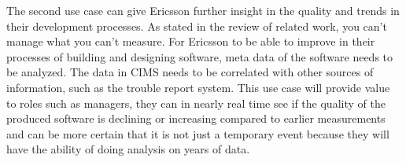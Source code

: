 The second use case can give Ericsson further insight in the quality and trends in their development processes. As stated in the review of related work, you can't manage what you can't measure. For Ericsson to be able to improve in their processes of building and designing software, meta data of the software needs to be analyzed. The data in CIMS needs to be correlated with other sources of information, such as the trouble report system. This use case will provide value to roles such as managers, they can in nearly real time see if the quality of the produced software is declining or increasing compared to earlier measurements and can be more certain that it is not just a temporary event because they will have the ability of doing analysis on years of data. 






